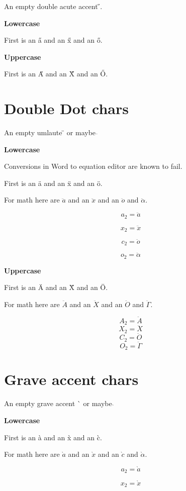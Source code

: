 \documentclass{article}
\begin{document}
An empty double acute accent \H{}.

\textbf{Lowercase}

First is an \H{a} and an \H{x} and an \H{o}.

\textbf{Uppercase}

First is an \H{A} and an \H{X} and an \H{O}.




\section{Double Dot chars}

An empty umlaute \"{} or maybe $\ddot{}$

\textbf{Lowercase}

Conversions in Word to equation editor are known to fail. 

First is an \"{a} and an \"{x} and an \"{o}.

For math here are $\ddot{a}$ and an $\ddot{x}$ and an $\ddot{o}$ and $\ddot{\alpha}$.

$$a_2=\ddot{a}$$

$$x_2=\ddot{x}$$

$$c_2=\ddot{o}$$

$$o_2=\ddot{\alpha}$$

\textbf{Uppercase}

First is an \"{A} and an \"{X} and an \"{O}.

For math here are $\ddot{A}$ and an $\ddot{X}$ and an $\ddot{O}$ and $\ddot{\Gamma}$.

$$A_2=\ddot{A}$$
$$X_2=\ddot{X}$$
$$C_2=\ddot{O}$$
$$O_2=\ddot{\Gamma}$$




\section{Grave accent chars}

An empty grave accent \`{} or maybe $\grave{}$

\textbf{Lowercase}

First is an \`{a} and an \`{x} and an \`{c}.

For math here are $\grave{a}$ and an $\grave{x}$ and an $\grave{c}$ and $\grave{\alpha}$.

$$a_2=\grave{a}$$

$$x_2=\grave{x}$$
\end{document}
